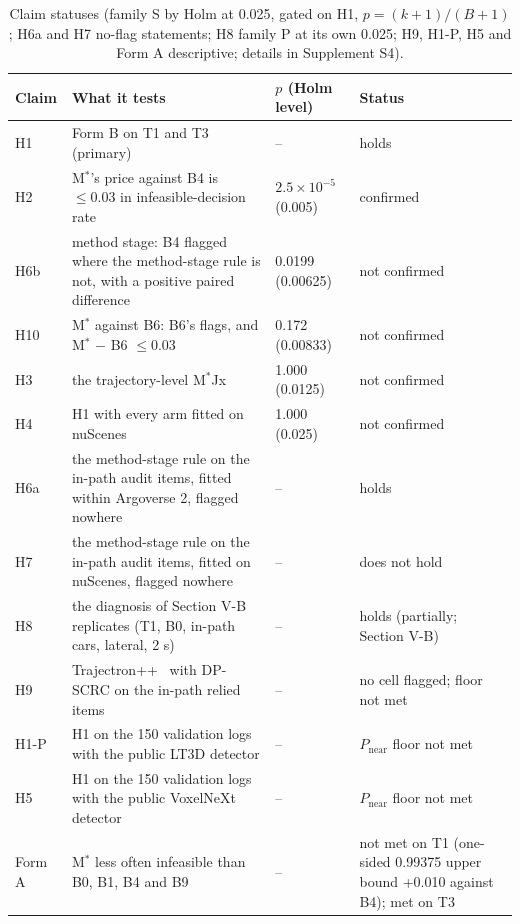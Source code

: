 \documentclass{ieeeaccess}
\begin{document}
\begin{table}[!t]
\centering
\caption{Claim statuses (family S by Holm at 0.025, gated on H1, $p = (k + 1)/(B + 1)$; H6a and H7 no-flag statements; H8 family P at its own 0.025; H9, H1-P, H5 and Form A descriptive; details in Supplement S4).}
\label{tab:5}
\footnotesize
\setlength{\tabcolsep}{4pt}
\renewcommand{\arraystretch}{1.15}
\begin{tabular}{@{}L{0.050\textwidth}L{0.443\textwidth}L{0.107\textwidth}L{0.347\textwidth}@{}}
\hline
Claim & What it tests & $p$ (Holm level) & Status \\
\hline
H1 & Form B on T1 and T3 (primary) & -- & holds \\
H2 & M$^{*}$'s price against B4 is $\leq 0.03$ in infeasible-decision rate & $2.5 \times 10^{-5}$ (0.005) & confirmed \\
H6b & method stage: B4 flagged where the method-stage rule is not, with a positive paired difference & 0.0199 (0.00625) & not confirmed \\
H10 & M$^{*}$ against B6: B6's flags, and M$^{*}$ $-$ B6 $\leq 0.03$ & 0.172 (0.00833) & not confirmed \\
H3 & the trajectory-level M$^{*}$Jx & 1.000 (0.0125) & not confirmed \\
H4 & H1 with every arm fitted on nuScenes & 1.000 (0.025) & not confirmed \\
H6a & the method-stage rule on the in-path audit items, fitted within Argoverse 2, flagged nowhere & -- & holds \\
H7 & the method-stage rule on the in-path audit items, fitted on nuScenes, flagged nowhere & -- & does not hold \\
H8 & the diagnosis of Section V-B replicates (T1, B0, in-path cars, lateral, 2 s) & -- & holds (partially; Section V-B) \\
H9 & Trajectron++~\cite{Salzmann2020} with DP-SCRC on the in-path relied items & -- & no cell flagged; floor not met \\
H1-P & H1 on the 150 validation logs with the public LT3D detector & -- & $P_{\mathrm{near}}$ floor not met \\
H5 & H1 on the 150 validation logs with the public VoxelNeXt detector~\cite{Chen2023voxelnext} & -- & $P_{\mathrm{near}}$ floor not met \\
Form A & M$^{*}$ less often infeasible than B0, B1, B4 and B9 & -- & not met on T1 (one-sided 0.99375 upper bound +0.010 against B4); met on T3 \\
\hline
\end{tabular}
\end{table}
\end{document}
